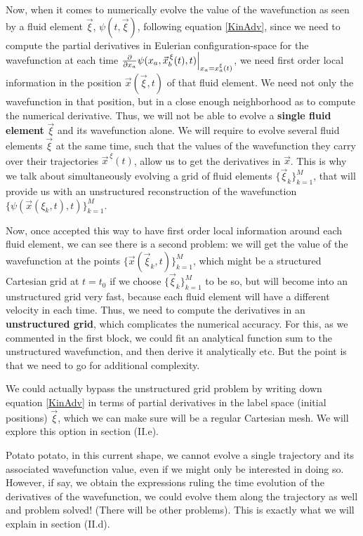 \documentclass[11pt, a4paper]{article} %
\begin{document}
Now, when it comes to numerically evolve the value of the wavefunction as seen by a fluid element $\vec{\xi}$, $\psi(t,\vec{\xi})$, following equation \eqref{KinAdv}, since we need to compute the partial derivatives in Eulerian configuration-space for the wavefunction at each time $\pdv{}{x_a}\psi(x_a,\vec{x}_b^{\, \xi}(t), t)\Big\rvert_{x_a=x^\xi_a(t)}$, we need first order local information in the position $\vec{x}(\vec{\xi},t)$ of that fluid element. We need not only the wavefunction in that position, but in a close enough neighborhood as to compute the numerical derivative. Thus, we will not be able to evolve a {\bf single fluid element} $\vec{\xi}$ and its wavefunction alone. We will require to evolve several fluid elements $\vec{\xi}$ at the same time, such that the values of the wavefunction they carry over their trajectories $\vec{x}^{\, \xi}(t)$, allow us to get the derivatives in $\vec{x}$. This is why we talk about simultaneously evolving a grid of fluid elements $\{\vec{\xi}_k\}_{k=1}^M$, that will provide us with an unstructured reconstruction of the wavefunction $\{\psi(\vec{x}(\xi_k,t),t) \}_{k=1}^M$. 

Now, once accepted this way to have first order local information around each fluid element, we can see there is a second problem: we will get the value of the wavefunction at the points $\{\vec{x}(\vec{\xi}_k,t)\}_{k=1}^M$, which might be a structured Cartesian grid at $t=t_0$ if we choose $\{\vec{\xi}_k\}_{k=1}^M$ to be so, but will become into an unstructured grid very fast, because each fluid element will have a different velocity in each time. Thus, we need to compute the derivatives in an {\bf unstructured grid}, which complicates the numerical accuracy. For this, as we commented in the first block, we could fit an analytical function sum to the unstructured wavefunction, and then derive it analytically etc. But the point is that we need to go for additional complexity.

We could actually bypass the unstructured grid problem by writing down equation \eqref{KinAdv} in terms of partial derivatives in the label space (initial positions) $\vec{\xi}$, which we can make sure will be a regular Cartesian mesh. We will explore this option in section (II.e). 

Potato potato, in this current shape, we cannot evolve a single trajectory and its associated wavefunction value, even if we might only be interested in doing so. However, if say, we obtain the expressions ruling the time evolution of the derivatives of the wavefunction, we could evolve them along the trajectory as well and problem solved! (There will be other problems). This is exactly what we will explain in section (II.d).
\end{document}
